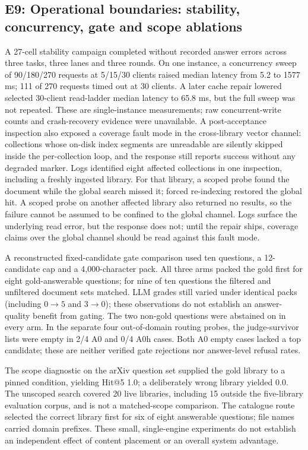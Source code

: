 \subsection{E9: Operational boundaries: stability, concurrency, gate and
scope ablations}
\label{sec:e7}
A 27-cell stability campaign completed without recorded answer errors across
three tasks, three lanes and three rounds. On one instance, a concurrency
sweep of 90/180/270 requests at 5/15/30 clients raised median latency from
5.2 to 1577 ms; 111 of 270 requests timed out at 30 clients. A later cache
repair lowered selected 30-client read-ladder median latency to 65.8 ms, but
the full sweep was not repeated. These are single-instance measurements;
raw concurrent-write counts and crash-recovery evidence were unavailable.
A post-acceptance inspection also exposed a coverage fault mode in the
cross-library vector channel: collections whose on-disk index segments are
unreadable are silently skipped inside the per-collection loop, and the
response still reports success without any degraded marker. Logs identified
eight affected collections in one inspection, including a freshly ingested
library. For that library, a scoped probe found the document while the global
search missed it; forced re-indexing restored the global hit. A scoped probe on
another affected library also returned no results, so the failure cannot be
assumed to be confined to the global channel. Logs surface the underlying
read error, but the response does not; until the repair ships, coverage
claims over the global channel should be read against this fault mode.

A reconstructed fixed-candidate gate comparison used ten questions, a
12-candidate cap and a 4,000-character pack. All three arms packed the gold
first for eight gold-answerable questions; for nine of ten questions the
filtered and unfiltered document sets matched. LLM grades still varied under
identical packs (including $0\to5$ and $3\to0$); these observations do not
establish an answer-quality benefit from gating. The two non-gold questions
were abstained on in every arm. In the separate four out-of-domain routing
probes, the judge-survivor lists were empty in 2/4 A0 and 0/4 A0h cases.
Both A0 empty cases lacked a top candidate; these are neither verified gate
rejections nor answer-level refusal rates.

The scope diagnostic on the arXiv question set supplied the gold library to a
pinned condition, yielding Hit@5 1.0; a deliberately wrong library yielded
0.0. The unscoped search covered 20 live libraries, including 15 outside the
five-library evaluation corpus, and is not a matched-scope comparison. The
catalogue route selected the correct library first for six of eight
answerable questions; file names carried domain prefixes. These small,
single-engine experiments do not establish an independent effect of content
placement or an overall system advantage.

